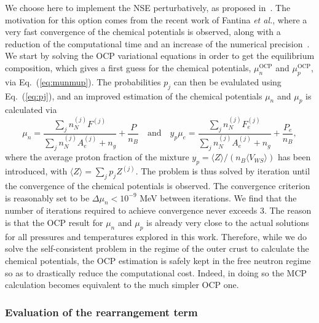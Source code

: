 We choose here to implement the NSE perturbatively, as proposed 
in~\cite{Grams2018}. 
The motivation for this option comes from the recent work of Fantina 
\textit{et al.}, where a very fast convergence of the chemical potentials is 
observed, along with a reduction of the computational time and an increase of
the numerical precision~\cite{Fantina2020}.
We start by solving the OCP variational equations in order to get the 
equilibrium composition, which gives a first guess for the chemical potentials,
$\mu_n^{\text{OCP}}$ and $\mu_p^{\text{OCP}}$, via Eq.~(\ref{eq:munmup}). 
The probabilities $p_j$ can then be evalulated using Eq.~(\ref{eq:pj}), and an
improved estimation of the chemical potentials $\mu_n$ and $\mu_p$ is
calculated via
%
\begin{equation}
  \mu_n = \frac{\sum_j n_N^{(j)}F^{(j)}}{\sum_j n_N^{(j)}A_e^{(j)} + n_g} +
  \frac{P}{n_B} \quad \text{and} \quad
  y_p\mu_e = \frac{\sum_j n_N^{(j)}F_e^{(j)}}{\sum_j n_N^{(j)}A_e^{(j)} + n_g} 
  + \frac{P_e}{n_B},
\end{equation}
%
where the average proton fraction of the mixture $y_p=\langle
Z\rangle/(n_B\langle V_{WS}\rangle)$ has been introduced, with 
$\langle Z \rangle = \sum_j p_j Z^{(j)}$. The problem is thus solved by
iteration until the convergence of the chemical potentials is observed. The
convergence criterion is reasonably set to be $\Delta \mu_n < 10^{-9}$ MeV
between iterations.
We find that the number of iterations required to achieve convergence never 
exceeds 3. The reason is that the OCP result for $\mu_n$ and $\mu_p$ is 
already very close to the actual solutions for all pressures and 
temperatures explored in this work. Therefore, while we do solve the 
self-consistent problem in the regime of the outer crust to calculate the 
chemical potentials, the OCP estimation is safely kept in the free neutron 
regime so as to drastically reduce the computational cost. Indeed, in doing so 
the MCP calculation becomes equivalent to the much simpler OCP one.

\subsubsection{Evaluation of the rearrangement term}\label{subsubsec:rear}

